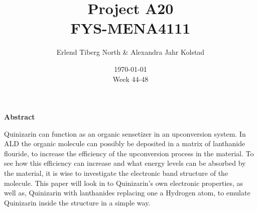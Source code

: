 \documentclass{article}
\begin{document}
\addtocounter{page}{0}

\title{Project A20 \\
      \large FYS-MENA4111}
\date{\today \\
    \vspace{1mm}
    \large Week 44-48}

\author{Erlend Tiberg North \& Alexandra Jahr Kolstad}

\maketitle






\vspace{1cm}


\begin{center}

{\Large\textbf{Abstract}} \label{sec:Abstract} \\

    \vspace{1mm}

    Quinizarin can function as an organic sensetizer in an upconversion system. In ALD the organic molecule can possibly be deposited in a matrix of lanthanide flouride, to increase the efficiency of the upconversion process in the material. To see how this efficiency can increase and what energy levels can be absorbed by the material, it is wise to investigate the electronic band structure of the molecule. This paper will look in to Quinizarin's own electronic properties, as well as, Quinizarin with lanthanides replacing one a Hydrogen atom, to emulate Quinizarin inside the structure in a simple way.

    \vspace{1cm}

\end{center}


\newpage

\vspace{1cm}

\tableofcontents

\vspace{1cm}
\end{document}
